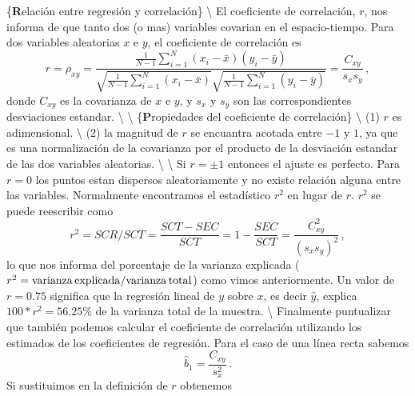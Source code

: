 \documentclass[
]{agujournal2019}
\begin{document}
\{\noindent \textbf Relación entre regresión y correlación\}
\textbackslash{} \noindent El coeficiente de correlación, \(r\), nos
informa de que tanto dos (o mas) variables covarian en el
espacio-tiempo. Para dos variables aleatorias \(x\) e \(y\), el
coeficiente de correlación es
\[r=\rho_{xy}=\frac{\frac{1}{N-1}\sum\limits^N_{i=1}(x_i-\bar{x})(y_i-\bar{y})}
     {\sqrt{\frac{1}{N-1}\sum\limits^N_{i=1}(x_i-\bar{x})}
     \sqrt{\frac{1}{N-1}\sum\limits^N_{i=1}(y_i-\bar{y})}}=\frac{C_{xy}}{s_x s_y}\,,\]
donde \(C_{xy}\) es la covarianza de \(x\) e \(y\), y \(s_x\) y \(s_y\)
son las correspondientes desviaciones estandar. \textbackslash{}
\textbackslash{} \{\textbf Propiedades del coeficiente de correlación\}
\textbackslash{} (1) \(r\) es adimensional. \textbackslash{} (2) la
magnitud de \(r\) se encuantra acotada entre \(-1\) y \(1\), ya que es
una normalización de la covarianza por el producto de la desviación
estandar de las dos variables aleatorias. \textbackslash{}
\textbackslash{} \noindent Si \(r=\pm1\) entonces el ajuste es perfecto.
Para \(r=0\) los puntos estan dispersos aleatoriamente y no existe
relación alguna entre las variables. Normalmente encontramos el
estadístico \(r^2\) en lugar de \(r\). \(r^2\) se puede reescribir como
\[r^2=SCR/SCT=\frac{SCT-SEC}{SCT}=1-\frac{SEC}{SCT}=\frac{C^2_{xy}}{(s_x s_y)^2}\,,\]
lo que nos informa del porcentaje de la varianza explicada
(\(r^2={\rm varianza\,explicada}/{\rm varianza\,total}\)) como vimos
anteriormente. Un valor de \(r=0.75\) significa que la regresión lineal
de \(y\) sobre \(x\), es decir \(\hat{y}\), explica \(100*r^2=56.25\%\)
de la varianza total de la muestra. \textbackslash{}
\noindent Finalmente puntualizar que también podemos calcular el
coeficiente de correlación utilizando los estimados de los coeficientes
de regresión. Para el caso de una línea recta sabemos
\[\hat{b}_1=\frac{C_{xy}}{s^2_x}\,.\] Si sustituimos en la definición de
\(r\) obtenemos
\end{document}
